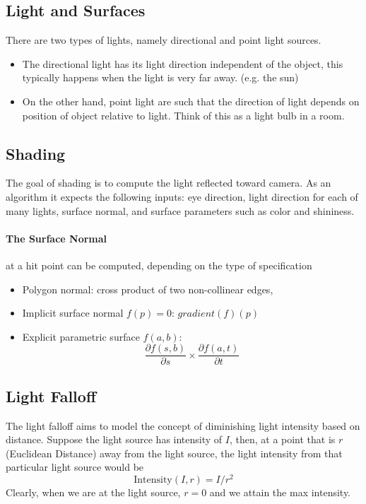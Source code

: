 \documentclass[11pt]{article}
\begin{document}
\subsection{Light and Surfaces}
There are two types of lights, namely directional and point light sources. 
\begin{itemize}
	\item The directional light has its light direction independent of the object, this typically happens when the light is very far away. (e.g. the sun)
	\item On the other hand, point light are such that the direction of light depends on position of object relative to light. Think of this as a light bulb in a room. 
\end{itemize}
\subsection{Shading}
The goal of shading is to compute the light reflected toward camera. As an algorithm it expects the following inputs: eye direction, light direction for each of many lights, surface normal, and surface parameters such as color and shininess. 

\paragraph{The Surface Normal} at a hit point can be computed, depending on the type of specification
\begin{itemize}
	\item Polygon normal: cross product of two non-collinear edges, 
	\item Implicit surface normal $f(p) = 0$: $gradient(f)(p)$
	\item Explicit parametric surface $f(a,b)$: 
	\begin{equation}
		\frac{\partial f(s, b)}{\partial s} \times \frac{\partial f(a, t)}{\partial t}
	\end{equation}
\end{itemize}

\subsection{Light Falloff}
The light falloff aims to model the concept of diminishing light intensity based on distance. Suppose the light source has intensity of $I$, then, at a point that is $r$ (Euclidean Distance) away from the light source, the light intensity from that particular light source would be
\begin{equation}
	\text{Intensity}(I, r) = I / r^2
\end{equation}
Clearly, when we are at the light source, $r = 0$ and we attain the max intensity. 
\end{document}
